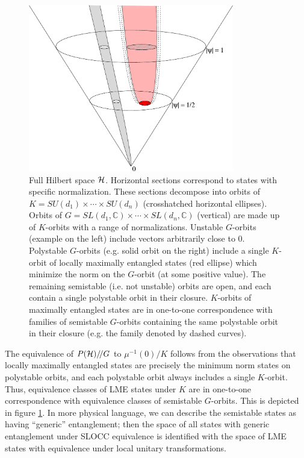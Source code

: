 \documentclass[12pt]{article}
\theoremstyle{definition}
\newcommand{\GITquot}{/\!/}
\begin{document}
\begin{figure}
\centering
\includegraphics[width=0.8\textwidth]{cone.eps}
\caption{Full Hilbert space ${\cal H}$. Horizontal sections correspond to states with specific normalization. These sections decompose into orbits of $K = SU(d_1) \times \cdots \times SU(d_n)$ (crosshatched horizontal ellipses). Orbits of $G = SL(d_1, \mathbb{C}) \times \cdots \times SL(d_n,\mathbb{C})$ (vertical) are made up of $K$-orbits with a range of normalizations. Unstable $G$-orbits (example on the left) include vectors arbitrarily close to 0. Polystable $G$-orbits (e.g. solid orbit on the right) include a single $K$-orbit of locally maximally entangled states (red ellipse) which minimize the norm on the $G$-orbit (at some positive value). The remaining semistable (i.e. not unstable) orbits are open, and each contain a single polystable orbit in their closure. $K$-orbits of maximally entangled states are in one-to-one correspondence with families of semistable $G$-orbits containing the same polystable orbit in their closure (e.g. the family denoted by dashed curves).}
\label{fig:cone}
\end{figure}

The equivalence of $P({\cal H})\GITquot G$ to $\mu^{-1}(0)/K$ follows from the observations that locally maximally entangled states are precisely the minimum norm states on polystable orbits, and each polystable orbit always includes a single $K$-orbit. Thus, equivalence classes of LME states under $K$ are in one-to-one correspondence with equivalence classes of semistable $G$-orbits. This is depicted in figure \ref{fig:cone}. In more physical language, we can describe the semistable states as having ``generic'' entanglement; then the space of all states with generic entanglement under SLOCC equivalence is identified with the space of LME states with equivalence under local unitary transformations.
\end{document}
